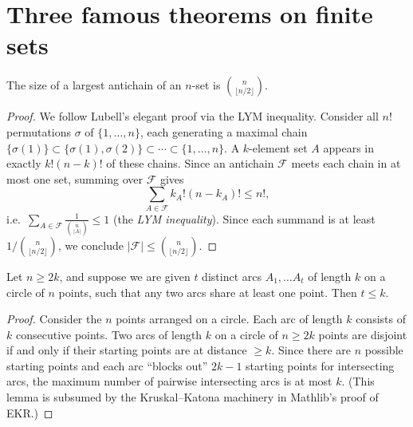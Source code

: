 \chapter{Three famous theorems on finite sets}
\label{chapter30}

\begin{theorem}
  \label{ch30theorem1}
  \leanok
  The size of a largest antichain of an $n$-set is $\binom{n}{\lfloor n/2\rfloor}$.
\end{theorem}
\begin{proof}
  \leanok
  We follow Lubell's elegant proof via the LYM inequality.
  Consider all $n!$ permutations $\sigma$ of $\{1,\dots,n\}$, each generating
  a maximal chain $\{\sigma(1)\} \subset \{\sigma(1),\sigma(2)\} \subset \cdots \subset \{1,\dots,n\}$.
  A $k$-element set $A$ appears in exactly $k!(n-k)!$ of these chains. Since an antichain
  $\mathcal{F}$ meets each chain in at most one set, summing over $\mathcal{F}$ gives
  \[
    \sum_{A \in \mathcal{F}} k_A!(n-k_A)! \le n!,
  \]
  i.e.\ $\sum_{A \in \mathcal{F}} \frac{1}{\binom{n}{|A|}} \le 1$
  (the \emph{LYM inequality}). Since each summand is at least $1/\binom{n}{\lfloor n/2\rfloor}$,
  we conclude $|\mathcal{F}| \le \binom{n}{\lfloor n/2\rfloor}$.
\end{proof}

\begin{lemma}
  \label{ch30lemma}
  Let $n \ge 2k$, and suppose we are given $t$ distinct arcs $A_1, \dots A_t$
  of length $k$ on a circle of $n$ points, such that any two arcs share at least one point. Then $t \le k$.
\end{lemma}
\begin{proof}
  Consider the $n$ points arranged on a circle. Each arc of length $k$ consists of $k$ consecutive points.
  Two arcs of length $k$ on a circle of $n \ge 2k$ points are disjoint if and only if their
  starting points are at distance $\ge k$. Since there are $n$ possible starting points and each
  arc ``blocks out'' $2k - 1$ starting points for intersecting arcs, the maximum number of
  pairwise intersecting arcs is at most $k$.
  (This lemma is subsumed by the Kruskal--Katona machinery in Mathlib's proof of EKR.)
\end{proof}

